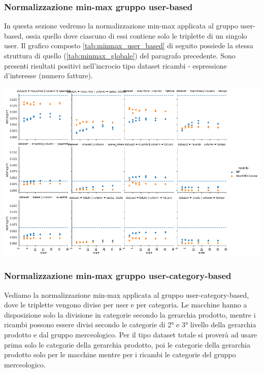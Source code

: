 \subsubsection{Normalizzazione min-max gruppo user-based}
In questa sezione vedremo la normalizzazione min-max applicata al gruppo user-based, ossia quello dove ciascuno di essi contiene solo le triplette di un singolo user. Il grafico composto \ref{tab:minmax_user_based} di seguito possiede la stessa struttura di quello (\ref{tab:minmax_globale}) del paragrafo precedente. Sono presenti risultati positivi nell'incrocio tipo dataset ricambi - espressione d'interesse (numero fatture).
\begin{center}
\includegraphics[width=16cm]{figures/risultati_minmax_singolo.png}
\label{tab:minmax_user_based}
\end{center}

\subsubsection{Normalizzazione min-max gruppo user-category-based}
Vediamo la normalizzazione min-max applicata al gruppo user-category-based, dove le triplette vengono divise per user e per categoria.
Le macchine hanno a disposizione solo la divisione in categorie secondo la gerarchia prodotto, mentre i ricambi possono essere divisi secondo le categorie di 2° e 3° livello della gerarchia prodotto e dal gruppo merceologico. Per il tipo dataset totale si proverà ad usare prima solo le categorie della gerarchia prodotto, poi le categorie della gerarchia prodotto solo per le macchine mentre per i ricambi le categorie del gruppo merceologico.
